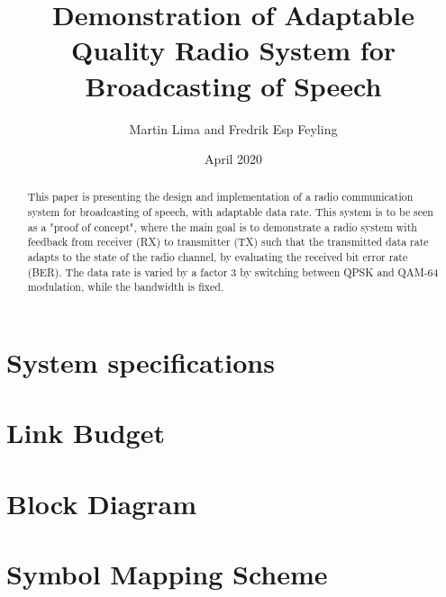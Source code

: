 \documentclass[9pt,journal]{IEEEtran}
\title{Demonstration of Adaptable Quality Radio System for Broadcasting of Speech}
\author{Martin Lima and Fredrik Esp Feyling }
\date{April 2020}
\begin{document}
\maketitle
\begin{abstract} 
This paper is presenting the design and implementation of a radio communication system for broadcasting of speech, with adaptable data rate. This system is to be seen as a "proof of concept", where the main goal is to demonstrate a radio system with feedback from receiver (RX) to transmitter (TX) such that the transmitted data rate adapts to the state of the radio channel, by evaluating the received bit error rate (BER). The data rate is varied by a factor 3 by switching between QPSK and QAM-64 modulation, while the bandwidth is fixed. 
\end{abstract}














\appendices
\section{System specifications}
\label{a:specs}


\section{Link Budget}
\label{a:link_budget}


\section{Block Diagram}
\label{a:block_diagram}



\section{Symbol Mapping Scheme}
\label{a:symbol_mapping}

\end{document}
